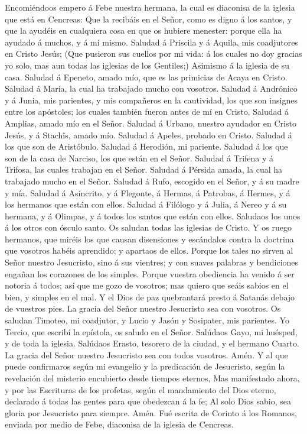  Encomiéndoos empero á Febe nuestra hermana, la cual es
diaconisa de la iglesia que está en Cencreas:  Que la
recibáis en el Señor, como es digno á los santos, y que la ayudéis en
cualquiera cosa en que os hubiere menester: porque ella ha ayudado á
muchos, y á mí mismo.  Saludad á Priscila y á Aquila, mis
coadjutores en Cristo Jesús;  (Que pusieron sus cuellos
por mi vida: á los cuales no doy gracias yo solo, mas aun todas las
iglesias de los Gentiles;)  Asimismo á la iglesia de su
casa. Saludad á Epeneto, amado mío, que es las primicias de Acaya en
Cristo.  Saludad á María, la cual ha trabajado mucho con
vosotros.  Saludad á Andrónico y á Junia, mis parientes, y
mis compañeros en la cautividad, los que son insignes entre los
apóstoles; los cuales también fueron antes de mí en Cristo.
 Saludad á Amplias, amado mío en el Señor. 
Saludad á Urbano, nuestro ayudador en Cristo Jesús, y á Stachîs, amado
mío.  Saludad á Apeles, probado en Cristo. Saludad á los
que son de Aristóbulo.  Saludad á Herodión, mi pariente.
Saludad á los que son de la casa de Narciso, los que están en el Señor.
 Saludad á Trifena y á Trifosa, las cuales trabajan en el
Señor. Saludad á Pérsida amada, la cual ha trabajado mucho en el Señor.
 Saludad á Rufo, escogido en el Señor, y á su madre y
mía.  Saludad á Asíncrito, y á Flegonte, á Hermas, á
Patrobas, á Hermes, y á los hermanos que están con ellos.
 Saludad á Filólogo y á Julia, á Nereo y á su hermana, y
á Olimpas, y á todos los santos que están con ellos. 
Saludaos los unos á los otros con ósculo santo. Os saludan todas las
iglesias de Cristo.  Y os ruego hermanos, que miréis los
que causan disensiones y escándalos contra la doctrina que vosotros
habéis aprendido; y apartaos de ellos.  Porque los tales
no sirven al Señor nuestro Jesucristo, sino á sus vientres; y con suaves
palabras y bendiciones engañan los corazones de los simples.
 Porque vuestra obediencia ha venido á ser notoria á
todos; así que me gozo de vosotros; mas quiero que seáis sabios en el
bien, y simples en el mal.  Y el Dios de paz quebrantará
presto á Satanás debajo de vuestros pies. La gracia del Señor nuestro
Jesucristo sea con vosotros.  Os saludan Timoteo, mi
coadjutor, y Lucio y Jasón y Sosipater, mis parientes. 
Yo Tercio, que escribí la epístola, os saludo en el Señor.
 Salúdaos Gayo, mi huésped, y de toda la iglesia.
Salúdaos Erasto, tesorero de la ciudad, y el hermano Cuarto.
 La gracia del Señor nuestro Jesucristo sea con todos
vosotros. Amén.  Y al que puede confirmaros según mi
evangelio y la predicación de Jesucristo, según la revelación del
misterio encubierto desde tiempos eternos,  Mas
manifestado ahora, y por las Escrituras de los profetas, según el
mandamiento del Dios eterno, declarado á todas las gentes para que
obedezcan á la fe;  Al solo Dios sabio, sea gloria por
Jesucristo para siempre. Amén. Fué escrita de Corinto á los Romanos,
enviada por medio de Febe, diaconisa de la iglesia de Cencreas.
